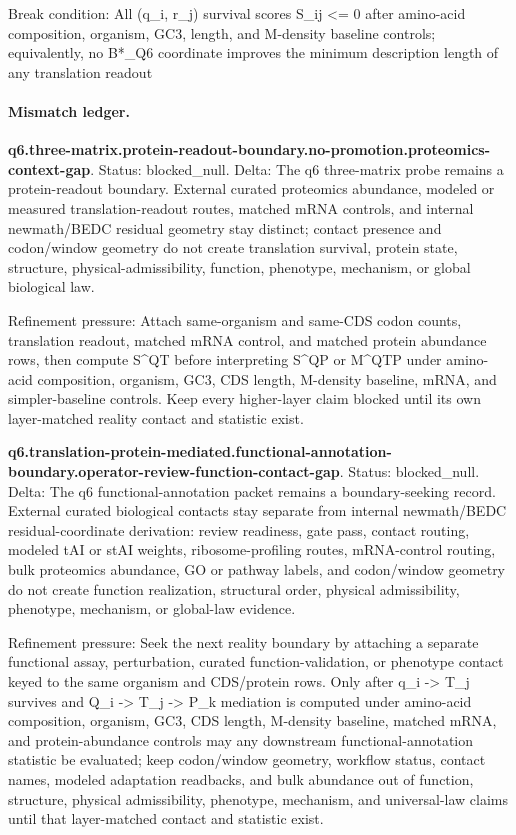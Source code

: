 Break condition: All (q\_i, r\_j) survival scores S\_ij <= 0 after amino-acid composition, organism, GC3, length, and M-density baseline controls; equivalently, no B*\_Q6 coordinate improves the minimum description length of any translation readout

\paragraph{Mismatch ledger.}
\textbf{q6.three-matrix.protein-readout-boundary.no-promotion.proteomics-context-gap}. Status: blocked\_null. Delta: The q6 three-matrix probe remains a protein-readout boundary. External curated proteomics abundance, modeled or measured translation-readout routes, matched mRNA controls, and internal newmath/BEDC residual geometry stay distinct; contact presence and codon/window geometry do not create translation survival, protein state, structure, physical-admissibility, function, phenotype, mechanism, or global biological law.

Refinement pressure: Attach same-organism and same-CDS codon counts, translation readout, matched mRNA control, and matched protein abundance rows, then compute S\textasciicircum{}QT before interpreting S\textasciicircum{}QP or M\textasciicircum{}QTP under amino-acid composition, organism, GC3, CDS length, M-density baseline, mRNA, and simpler-baseline controls. Keep every higher-layer claim blocked until its own layer-matched reality contact and statistic exist.

\textbf{q6.translation-protein-mediated.functional-annotation-boundary.operator-review-function-contact-gap}. Status: blocked\_null. Delta: The q6 functional-annotation packet remains a boundary-seeking record. External curated biological contacts stay separate from internal newmath/BEDC residual-coordinate derivation: review readiness, gate pass, contact routing, modeled tAI or stAI weights, ribosome-profiling routes, mRNA-control routing, bulk proteomics abundance, GO or pathway labels, and codon/window geometry do not create function realization, structural order, physical admissibility, phenotype, mechanism, or global-law evidence.

Refinement pressure: Seek the next reality boundary by attaching a separate functional assay, perturbation, curated function-validation, or phenotype contact keyed to the same organism and CDS/protein rows. Only after q\_i -> T\_j survives and Q\_i -> T\_j -> P\_k mediation is computed under amino-acid composition, organism, GC3, CDS length, M-density baseline, matched mRNA, and protein-abundance controls may any downstream functional-annotation statistic be evaluated; keep codon/window geometry, workflow status, contact names, modeled adaptation readbacks, and bulk abundance out of function, structure, physical admissibility, phenotype, mechanism, and universal-law claims until that layer-matched contact and statistic exist.

